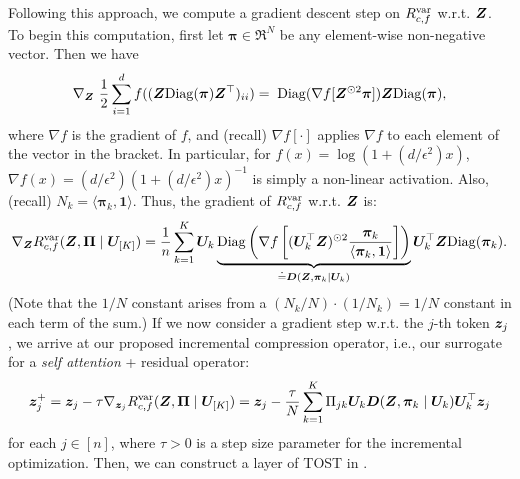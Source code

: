 \documentclass[\toplevelprefix/book-main.tex]{subfiles}
\begin{document}
Following this approach, we compute a gradient descent step on $R_{c,f}^{\rm var}$ w.r.t. $\bm{Z}$.
To begin this computation, first let $\bm \pi \in \Re^N$ be any element-wise non-negative vector. Then we have
\begin{equation}\label{eq1:grad Rcf}
\nabla_{\Z} \ \frac{1}{2} \sum_{i = 1}^{d} f(  (\Z \mathrm{Diag}(\bm \pi) \Z^{\top} )_{ii}) %
= \; \mathrm{Diag}(\nabla f[ \Z^{\odot 2} \bm \pi] ) \Z \mathrm{Diag}(\bm \pi),
\end{equation}
%
where $\nabla f$ is the gradient of $f$, and (recall) $\nabla f[\cdot]$ applies $\nabla f$ to each element of the vector in the bracket. In particular, for $ f(x) = \log(1 + (d/\epsilon^{2}) x)$,  $\nabla f(x) = (d / \epsilon^{2}) (1+ (d / \epsilon^{2}) x)^{-1}$ is simply a non-linear activation. Also, (recall) $N_{k} = \langle \bm \pi_{k}, \bm 1\rangle$. Thus, the gradient of $R^{\rm var}_{c,f}$ w.r.t. $\bm{Z}$ is:
\begin{align}\label{eq2:grad Rcf}
    \nabla_{\bm{Z}} R^{\rm var}_{c,f}(\bm{Z},\bm \Pi \mid \bm U_{[K]}) =  \frac{1}{n} \sum_{k=1}^K \bm U_{k} \underbrace{\mathrm{Diag} \left( \nabla f\left[ (\bm U_{k}^{\top} \bm{Z})^{\odot 2}  \frac{\bm \pi_k}{\langle \bm \pi_{k}, \bm 1\rangle} \right] \right)}_{\doteq \bm D(\bm{Z}, \bm \pi_{k} \mid \bm U_{k})} \bm U_{k}^{\top} \bm{Z} \mathrm{Diag}(\bm \pi_k).
\end{align}
(Note that the $1/N$ constant arises from a $(N_{k}/N)\cdot (1/N_{k}) = 1/N$ constant in each term of the sum.) If we now consider a gradient step w.r.t. the $j$-th token $\bm{z}_j$
, we arrive at our proposed incremental compression operator, i.e., our surrogate for a \textit{self attention} + residual operator:
%
\vspace{-2mm}
\begin{equation}\label{eq:layer-operation-orig}
    \bm{z}_j^+ = \bm{z}_{j} - \tau \nabla_{\bm{z}_{j}}R_{c, f}^{\rm var}(\bm{Z}, \bm \Pi \mid \bm U_{[K]}) = \bm{z}_j - \frac{\tau}{N} \sum_{k=1}^K \Pi_{jk} \bm U_{k} \bm D(\bm{Z}, \bm \pi_{k} \mid \bm U_{k}) \bm U_{k}^{\top} \bm{z}_j
\end{equation}
for each \(j \in [n]\), where $\tau > 0$ is a step size parameter for the incremental optimization. Then, we can construct a layer of TOST in .  
\end{document}
